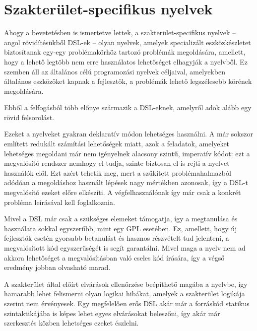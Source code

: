 \chapter{Szakterület-specifikus nyelvek}\label{chr:dsl}

Ahogy a bevetetésben is ismertetve lettek, a szakterület-specifikus nyelvek -- angol rövidítésükből \gls{DSL}-ek -- olyan nyelvek, amelyek specializált eszközkészletet biztosítanak egy-egy problémakörhöz tartozó problémák megoldására, amellett, hogy a lehető legtöbb nem erre használatos lehetőséget elhagyják a nyelvből.
Ez szemben áll az általános célú programozási nyelvek céljaival, amelyekben általános eszközöket kapnak a fejlesztők, a problémák lehető legszélesebb körének megoldására.

Ebből a felfogásból több előnye származik a \gls{DSL}-eknek, amelyről adok alább egy rövid felsorolást.

Ezeket a nyelveket gyakran deklaratív módon lehetséges használni.
A már sokszor említett redukált számítási lehetőségek miatt, azok a feladatok, amelyeket lehetséges megoldani már nem igényelnek alacsony szintű, imperatív kódot: ezt a megvalósító rendszer nemhogy el tudja, szinte biztosan el is rejti a nyelvet használók elől.
Ezt azért tehetik meg, mert a szűkített problémahalmazból adódóan a megoldáshoz használt lépések nagy mértékben azonosak, így a \gls{DSL}-t megvalósító ezeket előre elkészíti. 
A végfelhasználónak így már csak a konkrét probléma leírásával kell foglalkoznia.

Mivel a \gls{DSL} már csak a szükséges elemeket támogatja, így a megtanulása és használata sokkal egyszerűbb, mint egy \gls{GPL} esetében.
Ez, amellett, hogy új fejlesztők esetén gyorsabb betanulást és hasznos részvételt tud jelenteni, a megvalósított kód egyszerűségét is segít garantálni.
Mivel maga a nyelv nem ad akkora lehetőséget a megvalósításban való cseles kód írására, így a végső eredmény jobban olvasható marad.

A szakterület által előírt elvárások ellenőrzése beépíthető magába a nyelvbe, így hamarabb lehet felismerni olyan logikai hibákat, amelyek a szakterület logikája szerint nem érvényesek.
Egy megfelelően erős \gls{DSL} akár már a forráskód statikus szintaktikájába is képes lehet egyes elvárásokat beleszőni, így akár már szerkesztés közben lehetséges ezeket észlelni.

